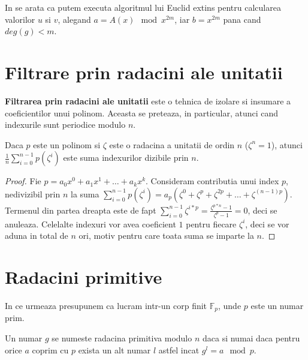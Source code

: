 In \cite{sugiyama} se arata ca putem executa algoritmul lui Euclid extins pentru
calcularea valorilor $u$ si $v$, alegand $a = A(x) \mod x^{2m}$, iar
$b = x^{2m}$ pana cand $deg(g) < m$.

\pagebreak

\section{Filtrare prin radacini ale unitatii}

\label{rootsofunityfilter}

\textbf{Filtrarea prin radacini ale unitatii} este o tehnica de izolare si
insumare a coeficientilor unui polinom. Aceasta se preteaza, in particular,
atunci cand indexurile sunt periodice modulo $n$.

\begin{thm}
  Daca $p$ este un polinom si $\zeta$ este o radacina a unitatii de ordin
  $n$ ($\zeta^{n} = 1$), atunci $\frac{1}{n} \displaystyle\sum\limits_{i=0}^{n-1} p(\zeta^{i})$
  este suma indexurilor dizibile prin $n$.
\end{thm}

\begin{proof}
  Fie $p = a_{0}x^{0} + a_{1}x^{1} + \ldots + a_{k}x^{k}$. Consideram contributia
  unui index $p$, nedivizibil prin $n$ la suma
  $\displaystyle\sum\limits_{i=0}^{n-1} p(\zeta^{i}) = a_{p}(\zeta^{0} + \zeta^{p} + \zeta^{2p} + \ldots + \zeta^{(n-1)p})$.
  Termenul din partea dreapta este de fapt $\displaystyle\sum\limits_{i=0}^{n-1} \zeta^{i*p} = \frac{\zeta^{p*n} - 1}{\zeta^{p} - 1} = 0$,
  deci se anuleaza. Celelalte indexuri vor avea coeficient $1$ pentru fiecare
  $\zeta^{i}$, deci se vor aduna in total de $n$ ori, motiv pentru care toata suma
  se imparte la $n$.
\end{proof}


\pagebreak

\section{Radacini primitive}
\label{primitiveroot}

In ce urmeaza presupunem ca lucram intr-un corp finit $\mathbb{F}_{p}$, unde $p$ este un numar prim.

\begin{defn}
  Un numar $g$ se numeste radacina primitiva modulo $n$ daca si numai daca pentru orice $a$ coprim cu $p$ exista un alt numar
  $l$ astfel incat $g^{l} = a \mod p$.
\end{defn}

